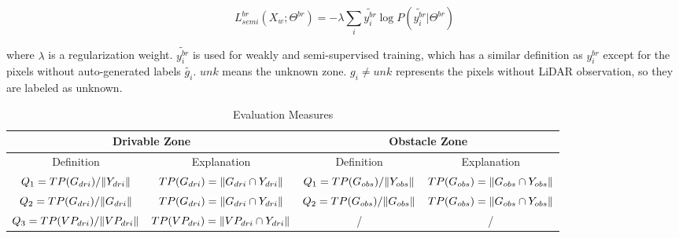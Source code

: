 \documentclass[letterpaper, 10 pt, conference]{ieeeconf}  %
\begin{document}
\vspace{-2mm}
\begin{equation}
\label{equ:loss1}
L^{br}_{semi}(X_w;\Theta^{br})=-\lambda \sum_{i}{\widetilde{y_i^{br}} \log{P(\widetilde{y_i^{br}}|\Theta^{br})}}
\end{equation}

where $\lambda$ is a regularization weight. $\widetilde{y_i^{br}}$ is used for weakly and semi-supervised training, which has a similar definition as $y_i^{br}$ except for the pixels without auto-generated labels $\widetilde{g_i}$. $unk$ means the unknown zone. $g_i\neq unk$ represents the pixels without LiDAR observation, so they are labeled as unknown.

\begin{table}
	\vspace{2mm}
	\caption{Evaluation Measures}
	\label{tab:evaluation}
	\centering
	\renewcommand{\arraystretch}{1.5}
	\begin{tabular}{cclccl}
		\hline
		\multicolumn{3}{c|}{Drivable Zone}                                                                                                    & \multicolumn{3}{c}{Obstacle Zone}                                                                                                  \\ \hline
		Definition                                            & \multicolumn{2}{c|}{Explanation}                                               & Definition                                          & \multicolumn{2}{c}{Explanation}                                               \\ \hline
		$Q_1={TP(G_{dri})}/{\Arrowvert Y_{dri} \Arrowvert}$   & \multicolumn{2}{c|}{$TP(G_{dri})=\Arrowvert G_{dri}\cap Y_{dri} \Arrowvert$}   & $Q_1={TP(G_{obs})}/{\Arrowvert Y_{obs} \Arrowvert}$ & \multicolumn{2}{c}{$TP(G_{obs})=\Arrowvert G_{obs}\cap Y_{obs} \Arrowvert$}   \\
		$Q_2={TP(G_{dri})}/{\Arrowvert G_{dri} \Arrowvert}$   & \multicolumn{2}{c|}{$TP(G_{dri})=\Arrowvert G_{dri}\cap Y_{dri} \Arrowvert$}   & $Q_2={TP(G_{obs})}/{\Arrowvert G_{obs} \Arrowvert}$ & \multicolumn{2}{c}{$TP(G_{obs})=\Arrowvert G_{obs}\cap Y_{obs} \Arrowvert$}   \\
		$Q_3={TP(VP_{dri})}/{\Arrowvert VP_{dri} \Arrowvert}$ & \multicolumn{2}{c|}{$TP(VP_{dri})=\Arrowvert VP_{dri}\cap Y_{dri} \Arrowvert$} & /                                                   & \multicolumn{2}{c}{/}                                                         \\

\end{tabular}
\end{table}
\end{document}
